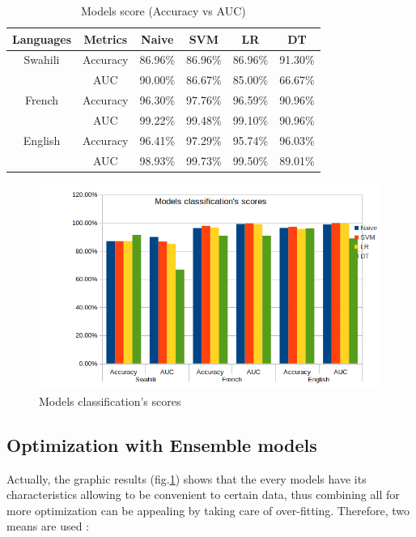 \documentclass[12pt,a4paper, oneside]{book}
\begin{document}
\begin{table}[h]
\centering
\begin{tabular}{cccccc}
	\hline 
	\hline
	Languages& Metrics  & Naive & SVM  & LR & DT   \\
	\hline
	\hline
	Swahili  &	Accuracy &	86.96\% &	86.96\% &	86.96\% &	91.30\%\\
	
	& AUC	&90.00\%	& 86.67\%	& 85.00\%	&66.67\% \\
			
	French	& Accuracy& 	96.30\% & 	97.76\% & 	96.59\% & 	90.96\% \\
			 & 	AUC & 	99.22\% & 	99.48\%	& 99.10\%& 	90.96\% \\
	English &	Accuracy&	96.41\%&	97.29\%	&95.74\%	&96.03\% \\
	
	& AUC	& 98.93\% &	99.73\%	& 99.50\% &	89.01\%	\\	
	\hline		
	\hline
\end{tabular}
\caption{Models score (Accuracy vs AUC)}

\end{table}

\begin{figure}[h]
	\centering
	\includegraphics[width=1\linewidth]{CollectImages/modelClassificationScore}
	\caption{Models classification's scores}
	\label{fig:modelclassificationscore}
\end{figure} 
\subsection{Optimization with Ensemble models}
Actually, the graphic results (fig.\ref{fig:modelclassificationscore}) shows that the every models have its characteristics allowing to be convenient to certain data, thus combining all for more optimization can be appealing by taking care of over-fitting. Therefore, two means are used :\\
\end{document}
